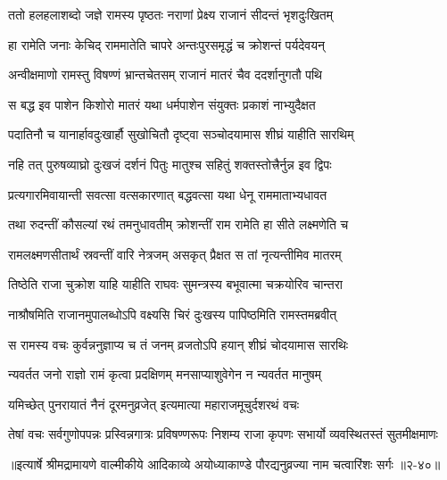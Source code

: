 \twolineshloka
{ततो हलहलाशब्दो जज्ञे रामस्य पृष्ठतः}
{नराणां प्रेक्ष्य राजानं सीदन्तं भृशदुःखितम्} %

\twolineshloka
{हा रामेति जनाः केचिद् राममातेति चापरे}
{अन्तःपुरसमृद्धं च क्रोशन्तं पर्यदेवयन्} %

\twolineshloka
{अन्वीक्षमाणो रामस्तु विषण्णं भ्रान्तचेतसम्}
{राजानं मातरं चैव ददर्शानुगतौ पथि} %

\twolineshloka
{स बद्ध इव पाशेन किशोरो मातरं यथा}
{धर्मपाशेन संयुक्तः प्रकाशं नाभ्युदैक्षत} %

\twolineshloka
{पदातिनौ च यानार्हावदुःखार्हौ सुखोचितौ}
{दृष्ट्वा सञ्चोदयामास शीघ्रं याहीति सारथिम्} %

\twolineshloka
{नहि तत् पुरुषव्याघ्रो दुःखजं दर्शनं पितुः}
{मातुश्च सहितुं शक्तस्तोत्त्रैर्नुन्न इव द्विपः} %

\twolineshloka
{प्रत्यगारमिवायान्ती सवत्सा वत्सकारणात्}
{बद्धवत्सा यथा धेनू राममाताभ्यधावत} %

\twolineshloka
{तथा रुदन्तीं कौसल्यां रथं तमनुधावतीम्}
{क्रोशन्तीं राम रामेति हा सीते लक्ष्मणेति च} %

\twolineshloka
{रामलक्ष्मणसीतार्थं स्रवन्तीं वारि नेत्रजम्}
{असकृत् प्रैक्षत स तां नृत्यन्तीमिव मातरम्} %

\twolineshloka
{तिष्ठेति राजा चुक्रोश याहि याहीति राघवः}
{सुमन्त्रस्य बभूवात्मा चक्रयोरिव चान्तरा} %

\twolineshloka
{नाश्रौषमिति राजानमुपालब्धोऽपि वक्ष्यसि}
{चिरं दुःखस्य पापिष्ठमिति रामस्तमब्रवीत्} %

\twolineshloka
{स रामस्य वचः कुर्वन्ननुज्ञाप्य च तं जनम्}
{व्रजतोऽपि हयान् शीघ्रं चोदयामास सारथिः} %

\twolineshloka
{न्यवर्तत जनो राज्ञो रामं कृत्वा प्रदक्षिणम्}
{मनसाप्याशुवेगेन न न्यवर्तत मानुषम्} %

\twolineshloka
{यमिच्छेत् पुनरायातं नैनं दूरमनुव्रजेत्}
{इत्यमात्या महाराजमूचुर्दशरथं वचः} %

\twolineshloka
{तेषां वचः सर्वगुणोपपन्नः प्रस्विन्नगात्रः प्रविषण्णरूपः}
{निशम्य राजा कृपणः सभार्यो व्यवस्थितस्तं सुतमीक्षमाणः} %


॥इत्यार्षे श्रीमद्रामायणे वाल्मीकीये आदिकाव्ये अयोध्याकाण्डे पौरद्यनुव्रज्या नाम चत्वारिंशः सर्गः ॥२-४०॥
